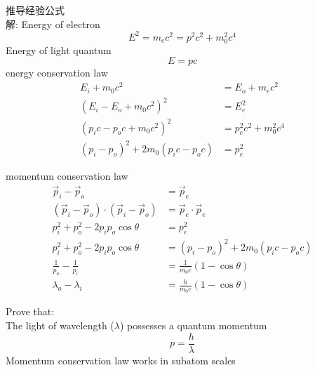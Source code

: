 \begin{frame}  
    推导经验公式\\
    \alert{解:} Energy of electron 
    \begin{equation*}
        E^2 =m_ec^2=p^2c^2 +m_0 ^2 c^4 
    \end{equation*}
    Energy of light quantum
    \begin{equation*}
        E =pc 
    \end{equation*}
    energy conservation law
    \begin{equation*}
        \begin{split}
        E_i + m_0 c^2 &= E_o + m_ec^2 \\
        (E_i -E_o + m_0 c^2)^2 &= E_e ^2\\
        (p_i c-p_o c + m_0 c^2) ^2 &= p_e ^2 c^2 +m_0 ^2 c^4 \\
        (p_i-p_o)^2 +2 m_0 (p_i c-p_o c) &= p_e ^2
    \end{split}
    \end{equation*}
\end{frame}

\begin{frame}  
    momentum conservation law
    \begin{equation*}
        \begin{split}
            \vec{p}_i -\vec{p}_o &= \vec{p}_e \\
            (\vec{p}_i -\vec{p}_o)\cdot (\vec{p}_i -\vec{p}_o)  &= \vec{p}_e\cdot \vec{p}_e   \\
            p_i ^2 + p_o ^2 -2p_i p_o \cos \theta &= p_e ^2  \\
            p_i ^2 + p_o ^2 -2p_i p_o \cos \theta &= (p_i-p_o)^2 +2 m_0 (p_i c-p_o c) \\
            \frac{1}{p_o} -\frac{1}{p_i} &= \frac{1}{m_0 c} (1-\cos \theta) \\
            \lambda_o -\lambda_i &= \frac{h}{m_0 c} (1-\cos \theta) 
        \end{split}
    \end{equation*}
\end{frame}

\begin{frame}   
    \begin{tcolorbox3}[Significance]
        Prove that:\\
        {\Bullet} The light of wavelength ($\lambda$) possesses a quantum momentum \[p=\frac{h}{\lambda}\]
        {\Bullet} Momentum conservation law works in subatom scales 
    \end{tcolorbox3}   
    \color{deepred}{Nobel Prize in physics（1927）}\\
\end{frame}

